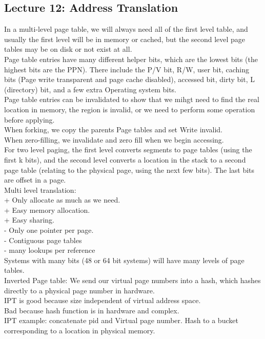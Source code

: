 \documentclass[paper=a4, fontsize=11pt]{scrartcl} %
\numberwithin{equation}{section} %
\numberwithin{figure}{section} %
\numberwithin{table}{section} %
\begin{document}
\subsection{Lecture 12: Address Translation}
In a multi-level page table, we will always need all of the first level table, and usually the first level will be in memory or cached, but the second level page tables may be on disk or not exist at all. \\
Page table entries have many different helper bits, which are the lowest bits (the highest bits are the PPN). There include the P/V bit, R/W, user bit, caching bits (Page write transparent and page cache disabled), accessed bit, dirty bit, L (directory) bit, and a few extra Operating system bits. \\
Page table entries can be invalidated to show that we mihgt need to find the real location in memory, the region is invalid, or we need to perform some operation before applying.\\
When forking, we copy the parents Page tables and set Write invalid. \\
When zero-filling, we invalidate and zero fill when we begin accessing. \\
For two level paging, the first level converts segments to page tables (using the first k bits), and the second level converts a location in the stack to a second page table (relating to the physical page, using the next few bits). The last bits are offset in a page. \\
Multi level translation: \\
+ Only allocate as much as we need. \\
+ Easy memory allocation. \\
+ Easy sharing. \\
- Only one pointer per page. \\
- Contiguous page tables\\
- many lookups per reference\\
Systems with many bits (48 or 64 bit systems) will have many levels of page tables. \\
Inverted Page table: We send our virtual page numbers into a hash, which hashes directly to a physical page number in hardware. \\
IPT is good because size independent of virtual address space. \\
Bad because hash function is in hardware and complex. \\
IPT example: concatenate pid and Virtual page number. Hash to a bucket corresponding to a location in physical memory. \\
\end{document}
